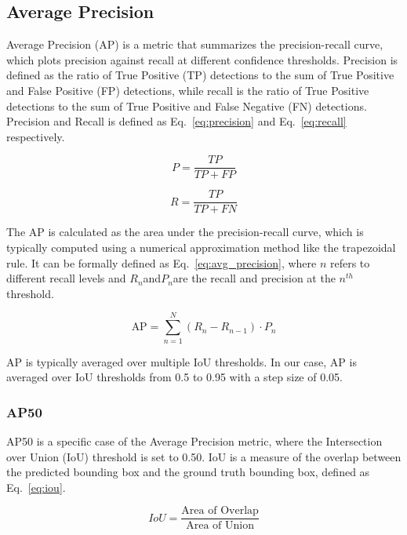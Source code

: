 \subsection{Average Precision}
Average Precision (AP) is a metric that summarizes the precision-recall curve, which plots precision against recall at different confidence thresholds. Precision is defined as the ratio of True Positive (TP) detections to the sum of True Positive and False Positive (FP) detections, while recall is the ratio of True Positive detections to the sum of True Positive and False Negative (FN) detections. Precision and Recall is defined as Eq.~\ref{eq:precision} and Eq.~\ref{eq:recall} respectively.

\begin{equation}
\label{eq:precision}
    P = \frac{TP}{TP + FP}
\end{equation}

\begin{equation}
	\label{eq:recall}
	R = \frac{TP}{TP + FN}
\end{equation}

The AP is calculated as the area under the precision-recall curve, which is typically computed using a numerical approximation method like the trapezoidal rule. It can be formally defined as Eq.~\ref{eq:avg_precision}, where \(n\) refers to different recall levels and \(R_n\)​ and\(P_n\)​ are the recall and precision at the \(n^{th}\) threshold.

\begin{equation}
	\label{eq:avg_precision}
	\text{AP} = \sum_{n=1}^{N} (R_n - R_{n-1}) \cdot P_n
\end{equation}

AP is typically averaged over multiple IoU thresholds. In our case, AP is averaged over IoU thresholds from 0.5 to 0.95 with a step size of 0.05.

\subsubsection{AP50}
AP50 is a specific case of the Average Precision metric, where the Intersection over Union (IoU) threshold is set to 0.50. IoU is a measure of the overlap between the predicted bounding box and the ground truth bounding box, defined as Eq.~\ref{eq:iou}.

\begin{equation}
	\label{eq:iou}
	IoU = \frac{\text{Area of Overlap}}{\text{Area of Union}}
\end{equation}

